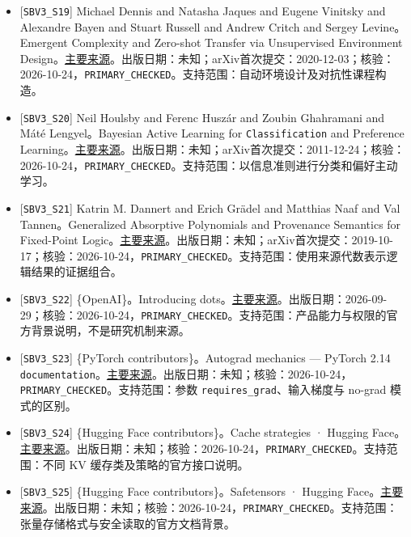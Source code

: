 \documentclass[
  10pt,
]{article}
\begin{document}
\begin{itemize}
\item
  {[}\nolinkurl{SBV3_S19}{]} Michael Dennis and Natasha Jaques and
  Eugene Vinitsky and Alexandre Bayen and Stuart Russell and Andrew
  Critch and Sergey Levine。Emergent Complexity and Zero-shot Transfer
  via Unsupervised Environment
  Design。\href{https://arxiv.org/abs/2012.02096}{主要来源}。出版日期：未知；arXiv首次提交：2020-12-03；核验：2026-10-24，\nolinkurl{PRIMARY_CHECKED}。支持范围：自动环境设计及对抗性课程构造。
\item
  {[}\nolinkurl{SBV3_S20}{]} Neil Houlsby and Ferenc Huszár and Zoubin
  Ghahramani and Máté Lengyel。Bayesian Active Learning for
  \nolinkurl{Classification} and Preference
  Learning。\href{https://arxiv.org/abs/1112.5745}{主要来源}。出版日期：未知；arXiv首次提交：2011-12-24；核验：2026-10-24，\nolinkurl{PRIMARY_CHECKED}。支持范围：以信息准则进行分类和偏好主动学习。
\item
  {[}\nolinkurl{SBV3_S21}{]} Katrin M. Dannert and Erich Grädel and
  Matthias Naaf and Val Tannen。Generalized Absorptive Polynomials and
  Provenance Semantics for Fixed-Point
  Logic。\href{https://arxiv.org/abs/1910.07910}{主要来源}。出版日期：未知；arXiv首次提交：2019-10-17；核验：2026-10-24，\nolinkurl{PRIMARY_CHECKED}。支持范围：使用来源代数表示逻辑结果的证据组合。
\item
  {[}\nolinkurl{SBV3_S22}{]} \{OpenAI\}。Introducing
  dots。\href{https://openai.com/index/introducing-dots/}{主要来源}。出版日期：2026-09-29；核验：2026-10-24，\nolinkurl{PRIMARY_CHECKED}。支持范围：产品能力与权限的官方背景说明，不是研究机制来源。
\item
  {[}\nolinkurl{SBV3_S23}{]} \{PyTorch contributors\}。Autograd
  mechanics --- PyTorch 2.14
  \nolinkurl{documentation}。\href{https://docs.pytorch.org/docs/2.14/notes/autograd.html}{主要来源}。出版日期：未知；核验：2026-10-24，\nolinkurl{PRIMARY_CHECKED}。支持范围：参数
  \nolinkurl{requires_grad}、输入梯度与 no-grad 模式的区别。
\item
  {[}\nolinkurl{SBV3_S24}{]} \{Hugging Face contributors\}。Cache
  strategies · Hugging
  Face。\href{https://huggingface.co/docs/transformers/main/en/kv_cache}{主要来源}。出版日期：未知；核验：2026-10-24，\nolinkurl{PRIMARY_CHECKED}。支持范围：不同
  KV 缓存类及策略的官方接口说明。
\item
  {[}\nolinkurl{SBV3_S25}{]} \{Hugging Face contributors\}。Safetensors
  · Hugging
  Face。\href{https://huggingface.co/docs/safetensors/index}{主要来源}。出版日期：未知；核验：2026-10-24，\nolinkurl{PRIMARY_CHECKED}。支持范围：张量存储格式与安全读取的官方文档背景。

\end{itemize}
\end{document}
